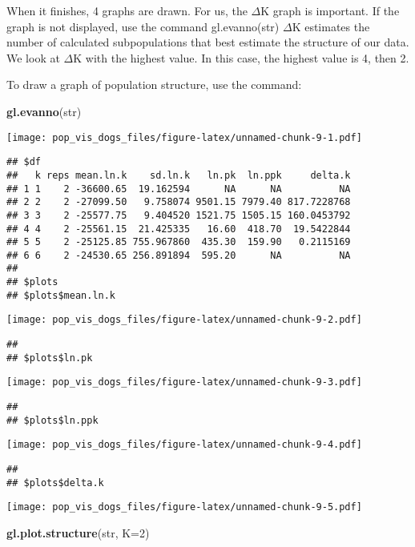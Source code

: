 \documentclass[
]{article}
\newenvironment{Shaded}{\begin{snugshade}}{\end{snugshade}}
\newcommand{\AttributeTok}[1]{\textcolor[rgb]{0.13,0.29,0.53}{#1}}
\newcommand{\DecValTok}[1]{\textcolor[rgb]{0.00,0.00,0.81}{#1}}
\newcommand{\FunctionTok}[1]{\textcolor[rgb]{0.13,0.29,0.53}{\textbf{#1}}}
\newcommand{\NormalTok}[1]{#1}
\begin{document}
When it finishes, 4 graphs are drawn. For us, the \(\Delta\)K graph is
important. If the graph is not displayed, use the command gl.evanno(str)
\(\Delta\)K estimates the number of calculated subpopulations that best
estimate the structure of our data. We look at \(\Delta\)K with the
highest value. In this case, the highest value is 4, then 2.

To draw a graph of population structure, use the command:

\begin{Shaded}
\begin{Highlighting}[]
\FunctionTok{gl.evanno}\NormalTok{(str)}
\end{Highlighting}
\end{Shaded}

\texttt{[image: pop\_vis\_dogs\_files/figure-latex/unnamed-chunk-9-1.pdf]}

\begin{verbatim}
## $df
##   k reps mean.ln.k    sd.ln.k   ln.pk  ln.ppk     delta.k
## 1 1    2 -36600.65  19.162594      NA      NA          NA
## 2 2    2 -27099.50   9.758074 9501.15 7979.40 817.7228768
## 3 3    2 -25577.75   9.404520 1521.75 1505.15 160.0453792
## 4 4    2 -25561.15  21.425335   16.60  418.70  19.5422844
## 5 5    2 -25125.85 755.967860  435.30  159.90   0.2115169
## 6 6    2 -24530.65 256.891894  595.20      NA          NA
## 
## $plots
## $plots$mean.ln.k
\end{verbatim}

\texttt{[image: pop\_vis\_dogs\_files/figure-latex/unnamed-chunk-9-2.pdf]}

\begin{verbatim}
## 
## $plots$ln.pk
\end{verbatim}

\texttt{[image: pop\_vis\_dogs\_files/figure-latex/unnamed-chunk-9-3.pdf]}

\begin{verbatim}
## 
## $plots$ln.ppk
\end{verbatim}

\texttt{[image: pop\_vis\_dogs\_files/figure-latex/unnamed-chunk-9-4.pdf]}

\begin{verbatim}
## 
## $plots$delta.k
\end{verbatim}

\texttt{[image: pop\_vis\_dogs\_files/figure-latex/unnamed-chunk-9-5.pdf]}

\begin{Shaded}
\begin{Highlighting}[]
\FunctionTok{gl.plot.structure}\NormalTok{(str, }\AttributeTok{K=}\DecValTok{2}\NormalTok{)}
\end{Highlighting}
\end{Shaded}
\end{document}

